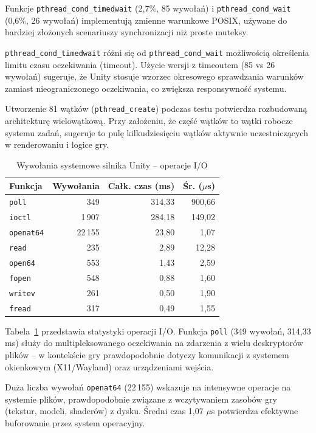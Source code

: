 Funkcje \texttt{pthread\_cond\_timedwait} (2,7\%, 85 wywołań) i \texttt{pthread\_cond\_wait} (0,6\%, 26 wywołań) implementują zmienne warunkowe POSIX, 
używane do bardziej złożonych scenariuszy synchronizacji niż proste muteksy.

\texttt{pthread\_cond\_timedwait} różni się od \texttt{pthread\_cond\_wait} możliwością określenia limitu czasu oczekiwania (timeout). Użycie wersji z 
timeoutem (85 vs 26 wywołań) sugeruje, że Unity stosuje wzorzec okresowego sprawdzania warunków zamiast nieograniczonego oczekiwania, co zwiększa 
responsywność systemu.

Utworzenie 81 wątków (\texttt{pthread\_create}) podczas testu potwierdza rozbudowaną architekturę wielowątkową. Przy założeniu, że część wątków to wątki 
robocze systemu zadań, sugeruje to pulę kilkudziesięciu wątków aktywnie uczestniczących w renderowaniu i logice gry.

\begin{table}[H]
\centering
\caption{Wywołania systemowe silnika Unity -- operacje I/O}
\label{tab:unity-osrt-io}
\begin{tabular}{|l|r|r|r|}
\hline
\textbf{Funkcja} & \textbf{Wywołania} & \textbf{Całk. czas (ms)} & \textbf{Śr. ($\mu$s)} \\
\hline
\texttt{poll} & 349 & 314,33 & 900,66 \\
\texttt{ioctl} & 1\,907 & 284,18 & 149,02 \\
\texttt{openat64} & 22\,155 & 23,80 & 1,07 \\
\texttt{read} & 235 & 2,89 & 12,28 \\
\texttt{open64} & 553 & 1,43 & 2,59 \\
\texttt{fopen} & 548 & 0,88 & 1,60 \\
\texttt{writev} & 261 & 0,50 & 1,90 \\
\texttt{fread} & 317 & 0,49 & 1,55 \\
\hline
\end{tabular}
\end{table}


Tabela~\ref{tab:unity-osrt-io} przedstawia statystyki operacji I/O. Funkcja \texttt{poll} (349 wywołań, 314,33 ms) służy do multipleksowanego 
oczekiwania na zdarzenia z wielu deskryptorów plików -- w kontekście gry prawdopodobnie dotyczy komunikacji z systemem okienkowym (X11/Wayland) 
oraz urządzeniami wejścia.

Duża liczba wywołań \texttt{openat64} (22\,155) wskazuje na intensywne operacje na systemie plików, prawdopodobnie związane z wczytywaniem zasobów 
gry (tekstur, modeli, shaderów) z dysku. Średni czas 1,07 $\mu$s potwierdza efektywne buforowanie przez system operacyjny.


